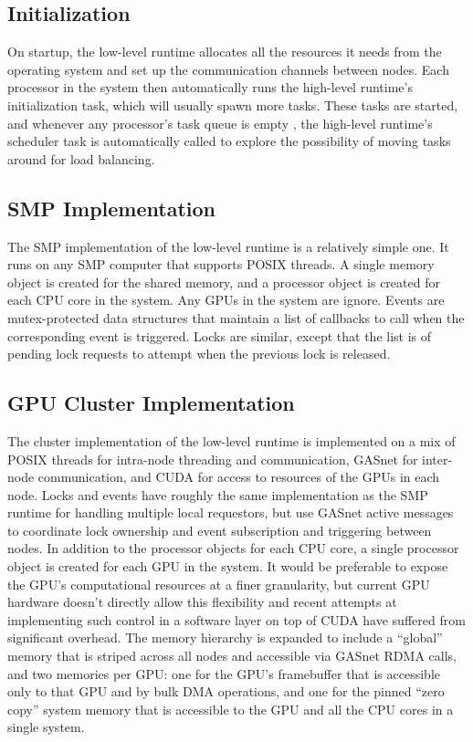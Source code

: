 \subsection{Initialization}

On startup, the low-level runtime allocates all the resources it needs from
the operating system and set up the communication channels between nodes.
Each processor in the system then automatically runs the high-level runtime's
initialization task, which will usually spawn more tasks.  These tasks are
started, and whenever any processor's task queue is empty , the high-level
runtime's scheduler task is automatically called to explore the possibility
of moving tasks around for load balancing.

\subsection{SMP Implementation}

The SMP implementation of the low-level runtime is a relatively simple one.
It runs on any SMP computer that supports POSIX threads.  A single memory
object is created for the shared memory, and a processor object is created for
each CPU core in the system.  Any GPUs in the system are ignore.  Events are 
mutex-protected data structures that maintain a list of callbacks to call when
the corresponding event is triggered.  Locks are similar, except that the list
is of pending lock requests to attempt when the previous lock is released.

\subsection{GPU Cluster Implementation}

The cluster implementation of the low-level runtime is implemented on a mix
of POSIX threads for intra-node threading and communication, GASnet for 
inter-node communication, and CUDA for access to resources of the GPUs in 
each node.  Locks and events have roughly the same implementation as the SMP
runtime for handling multiple local requestors, but use GASnet active messages
to coordinate lock ownership and event subscription and triggering between
nodes.  In addition to the processor objects for each CPU core, a single
processor object is created for each GPU in the system.  It would be preferable
to expose the GPU's computational resources at a finer granularity, but
current GPU hardware doesn't directly allow this flexibility and recent attempts
at implementing such control in a software layer on top of CUDA have suffered
from significant overhead.  The memory hierarchy is expanded to include a 
``global'' memory that is striped across all nodes and accessible via GASnet
RDMA calls, and two memories per GPU: one for the GPU's framebuffer that is
accessible only to that GPU and by bulk DMA operations, and one for the pinned
``zero copy'' system memory that is accessible to the GPU and all the CPU cores
in a single system.
